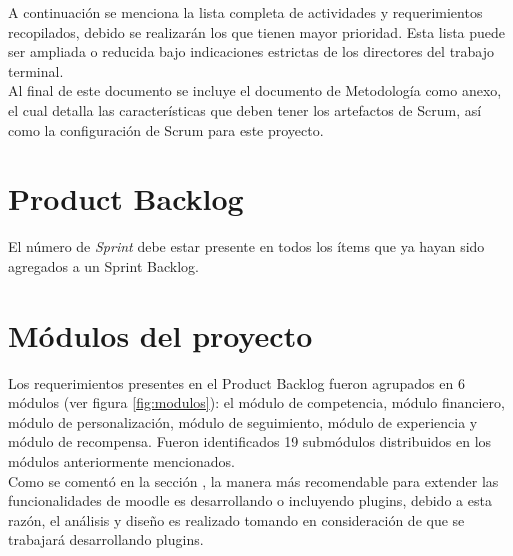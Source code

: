 \noindent A continuación se menciona la lista completa de actividades y requerimientos recopilados, debido 
se realizarán los que tienen mayor prioridad. Esta lista puede ser ampliada o reducida bajo indicaciones estrictas de los directores del trabajo terminal.\\

\noindent Al final de este documento se incluye el documento de Metodología como anexo, el cual detalla las características que deben tener los artefactos de Scrum, así como la configuración de Scrum para este proyecto.\\

\section{Product Backlog}

    \begin{multicols}{2}
    
    
    \end{multicols}

     El número de {\it Sprint} debe estar presente en todos los ítems que ya hayan sido agregados a un Sprint Backlog.
    
    
\clearpage    
\section{Módulos del proyecto}
    
    Los requerimientos presentes en el Product Backlog fueron agrupados en 6 módulos (ver figura \ref{fig:modulos}): el módulo de competencia, módulo financiero, módulo de personalización, módulo de seguimiento, módulo de experiencia y módulo de recompensa. Fueron identificados 19 submódulos distribuidos en los módulos anteriormente mencionados.\\
    
    \noindent Como se comentó en la sección , la manera más recomendable para extender las funcionalidades de moodle es desarrollando o incluyendo plugins, debido a esta razón, el análisis y diseño es realizado tomando en consideración de que se trabajará desarrollando plugins.
    
